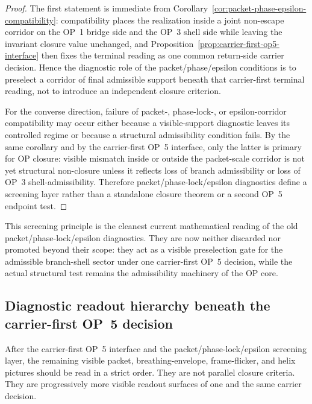 \begin{proof}
The first statement is immediate from Corollary~\ref{cor:packet-phase-epsilon-compatibility}: compatibility places the realization inside a joint non-escape corridor on the OP~1 bridge side and the OP~3 shell side while leaving the invariant closure value unchanged, and Proposition~\ref{prop:carrier-first-op5-interface} then fixes the terminal reading as one common return-side carrier decision. Hence the diagnostic role of the packet/phase/epsilon conditions is to preselect a corridor of final admissible support beneath that carrier-first terminal reading, not to introduce an independent closure criterion.

For the converse direction, failure of packet-, phase-lock-, or epsilon-corridor compatibility may occur either because a visible-support diagnostic leaves its controlled regime or because a structural admissibility condition fails. By the same corollary and by the carrier-first OP~5 interface, only the latter is primary for OP closure: visible mismatch inside or outside the packet-scale corridor is not yet structural non-closure unless it reflects loss of branch admissibility or loss of OP~3 shell-admissibility. Therefore packet/phase-lock/epsilon diagnostics define a screening layer rather than a standalone closure theorem or a second OP~5 endpoint test.
\end{proof}

\begin{remark}
This screening principle is the cleanest current mathematical reading of the old packet/phase-lock/epsilon diagnostics. They are now neither discarded nor promoted beyond their scope: they act as a visible preselection gate for the admissible branch-shell sector under one carrier-first OP~5 decision, while the actual structural test remains the admissibility machinery of the OP core.
\end{remark}


\subsection{Diagnostic readout hierarchy beneath the carrier-first OP~5 decision}
\label{sec:diagnostic-readout-hierarchy}

After the carrier-first OP~5 interface and the packet/phase-lock/epsilon screening layer, the remaining visible packet, breathing-envelope, frame-flicker, and helix pictures should be read in a strict order. They are not parallel closure criteria. They are progressively more visible readout surfaces of one and the same carrier decision.

